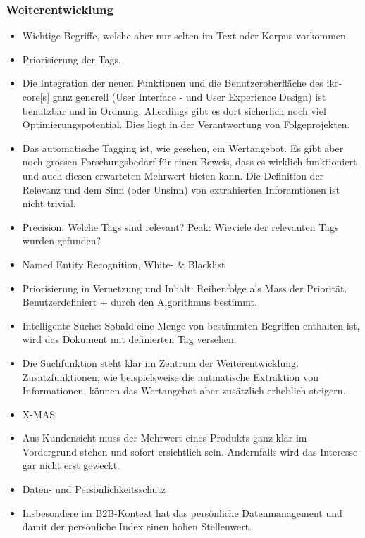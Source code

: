 \subsubsection{Weiterentwicklung}

\begin{itemize}
    \item Wichtige Begriffe, welche aber nur selten im Text oder Korpus vorkommen.
    \item Priorisierung der Tags.
    \item Die Integration der neuen Funktionen und die Benutzeroberfläche des \gls{ikc-core}[s] ganz generell (User Interface - und User Experience Design) ist benutzbar und in Ordnung. Allerdings gibt es dort sicherlich noch viel Optimierungspotential. Dies liegt in der Verantwortung von Folgeprojekten.
    \item Das automatische Tagging ist, wie gesehen, ein Wertangebot. Es gibt aber noch grossen Forschungsbedarf für einen Beweis, dass es wirklich funktioniert und auch diesen erwarteten Mehrwert bieten kann. Die Definition der Relevanz und dem Sinn (oder Unsinn) von extrahierten Inforamtionen ist nicht trivial.
    \item Precision: Welche Tags sind relevant? Peak: Wieviele der relevanten Tags wurden gefunden?
    \item Named Entity Recognition, White- \& Blacklist
    \item Priorisierung in Vernetzung und Inhalt: Reihenfolge als Mass der Priorität. Benutzerdefiniert + durch den Algorithmus bestimmt.
    \item Intelligente Suche: Sobald eine Menge von bestimmten Begriffen enthalten ist, wird das Dokument mit definierten Tag versehen.
    \item Die Suchfunktion steht klar im Zentrum der Weiterentwicklung. Zusatzfunktionen, wie beispielsweise die autmatische Extraktion von Informationen, können das Wertangebot aber zusätzlich erheblich steigern.
    \item X-MAS
    \item Aus Kundensicht muss der Mehrwert eines Produkts ganz klar im Vordergrund stehen und sofort ersichtlich sein. Andernfalls wird das Interesse gar nicht erst geweckt.
    \item Daten- und Persönlichkeitsschutz
    \item Insbesondere im B2B-Kontext hat das persönliche Datenmanagement und damit der persönliche Index einen hohen Stellenwert. 
\end{itemize}

